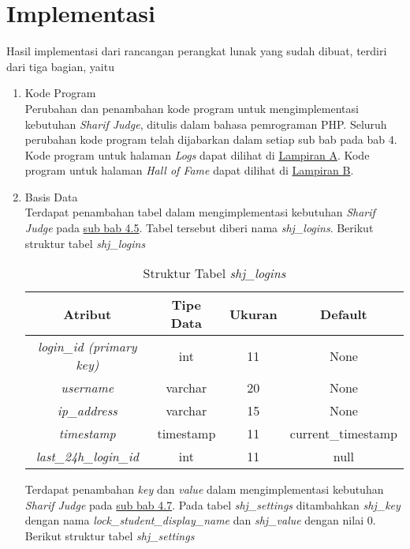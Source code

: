 \section{Implementasi}
Hasil implementasi dari rancangan perangkat lunak yang sudah dibuat, terdiri dari tiga bagian, yaitu
\begin{enumerate}
	\item Kode Program \\
	Perubahan dan penambahan kode program untuk mengimplementasi kebutuhan \textit{Sharif Judge}, ditulis dalam bahasa pemrograman PHP. Seluruh perubahan kode program telah dijabarkan dalam setiap sub bab pada bab 4. Kode program untuk halaman \textit{Logs} dapat dilihat di \hyperref[lamp:kodeprogramhalamanlogs]{Lampiran A}. Kode program untuk halaman \textit{Hall of Fame} dapat dilihat di \hyperref[lamp:kodeprogramhalamanhof]{Lampiran B}.
	\item Basis Data \\
	Terdapat penambahan tabel dalam mengimplementasi kebutuhan \textit{Sharif Judge} pada \hyperref[chap:logs]{sub bab 4.5}. Tabel tersebut diberi nama \textit{shj\_logins}. Berikut struktur tabel \textit{shj\_logins}
	\begin{table}[H] %
		\centering 
		\caption{Struktur Tabel \textit{shj\_logins}}
		\label{tab:tabellogsfix}
		\begin{tabular}{|c|c|c|c|}
			\hline
			\textbf{Atribut} & \textbf{Tipe Data} & \textbf{Ukuran}  & \textbf{Default} \\
			\hline
			\textit{login\_id (primary key)} & int & 11  & None \\
			\hline
			\textit{username} & varchar & 20  & None \\
			\hline
			\textit{ip\_address} & varchar & 15  & None \\
			\hline
			\textit{timestamp} & timestamp & 11  & current\_timestamp \\
			\hline
			\textit{last\_24h\_login\_id}	 & int & 11  & null \\
			\hline
		\end{tabular}
	\end{table}
	
	Terdapat penambahan \textit{key} dan \textit{value} dalam mengimplementasi kebutuhan \textit{Sharif Judge} pada \hyperref[chap:lock]{sub bab 4.7}. Pada tabel \textit{shj\_settings} ditambahkan \textit{shj\_key} dengan nama \textit{lock\_student\_display\_name} dan \textit{shj\_value} dengan nilai 0. Berikut struktur tabel \textit{shj\_settings}
	

\end{enumerate}
